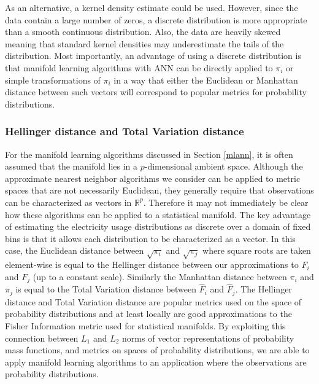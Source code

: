 \documentclass[11pt,a4paper,]{article}
\begin{document}
As an alternative, a kernel density estimate could be used. However, since the data contain a large number of zeros, a discrete distribution is more appropriate than a smooth continuous distribution. Also, the data are heavily skewed meaning that standard kernel densities may underestimate the tails of the distribution. Most importantly, an advantage of using a discrete distribution is that manifold learning algorithms with ANN can be directly applied to \(\pi_i\) or simple transformations of \(\pi_i\) in a way that either the Euclidean or Manhattan distance between such vectors will correspond to popular metrics for probability distributions.

\hypertarget{hellinger-distance-and-total-variation-distance}{%
\subsubsection*{Hellinger distance and Total Variation distance}\label{hellinger-distance-and-total-variation-distance}}

For the manifold learning algorithms discussed in Section \ref{mlann}, it is often assumed that the manifold lies in a \(p\)-dimensional ambient space. Although the approximate nearest neighbor algorithms we consider can be applied to metric spaces that are not necessarily Euclidean, they generally require that observations can be characterized as vectors in \(\mathbb{R}^p\). Therefore it may not immediately be clear how these algorithms can be applied to a statistical manifold. The key advantage of estimating the electricity usage distributions as discrete over a domain of fixed bins is that it allows each distribution to be characterized as a vector. In this case, the Euclidean distance between \(\sqrt{\pi_{i}}\) and \(\sqrt{\pi_{j}}\) where square roots are taken element-wise is equal to the Hellinger distance between our approximations to \(F_{i}\) and \(F_{j}\) (up to a constant scale). Similarly the Manhattan distance between \(\pi_{i}\) and \(\pi_{j}\) is equal to the Total Variation distance between \(\hat{F}_{i}\) and \(\hat{F}_{j}\). The Hellinger distance and Total Variation distance are popular metrics used on the space of probability distributions \autocite{Hellinger_undated-rs,lecam1973} and at least locally are good approximations to the Fisher Information metric used for statistical manifolds. By exploiting this connection between \(L_1\) and \(L_2\) norms of vector representations of probability mass functions, and metrics on spaces of probability distributions, we are able to apply manifold learning algorithms to an application where the observations are probability distributions.
\end{document}

